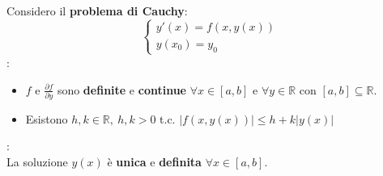\documentclass[a4paper, oneside]{article}
\newcommand\R{\mathbb{R}}
\newcommand\de{\partial}
\begin{document}
    \begin{theorem}
        Considero il \textbf{problema di Cauchy}:
        \[\begin{cases}
            y'(x) = f\left(x,y(x)\right) \\
            y(x_0) = y_0
        \end{cases}\]
        :
        \begin{itemize}
            \item $f$ e $\frac{\de f}{\de y}$ sono \textbf{definite} e \textbf{continue} $\forall x\in[a,b]$ e $\forall y\in\R$ 
            con $[a,b]\subseteq\R$.
            \item Esistono $h,k\in\R, \ h,k>0$ t.c.
            $\left|f\left(x,y(x)\right)\right| \leq h+k\left|y(x)\right|$
        \end{itemize}
        :\\
        La soluzione $y(x)$ è \textbf{unica} e \textbf{definita} $\forall x\in[a,b]$.
    \end{theorem}

    \newpage
\end{document}

